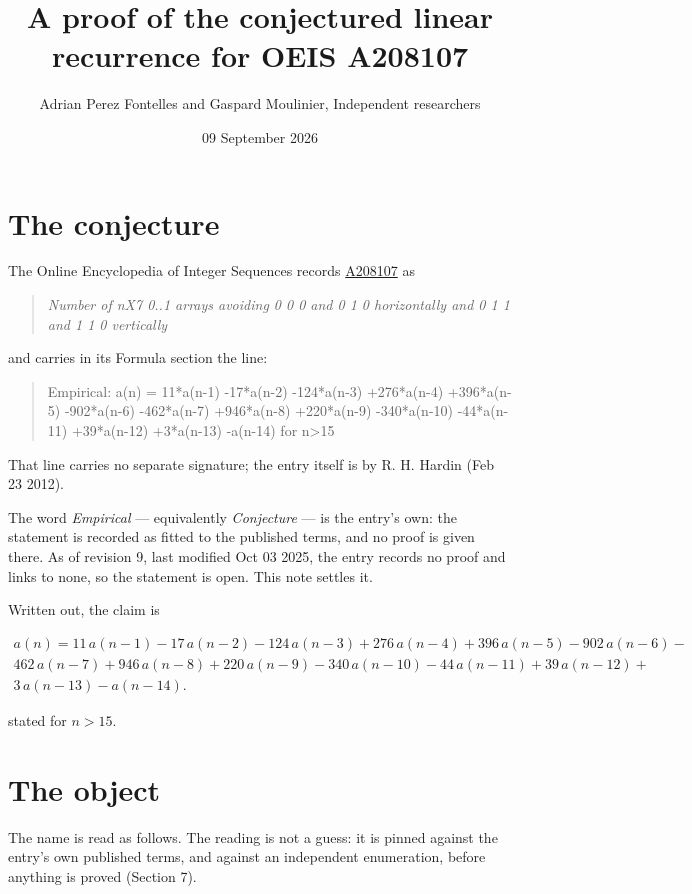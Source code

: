 \documentclass[11pt]{article}
\title{A proof of the conjectured linear recurrence for OEIS A208107}
\author{Adrian Perez Fontelles and Gaspard Moulinier, Independent researchers}
\date{09 September 2026}
\theoremstyle{definition}
\begin{document}
\maketitle
\section{The conjecture}

The Online Encyclopedia of Integer Sequences records \href{https://oeis.org/A208107}{A208107} as

\begin{quote}\itshape Number of nX7 0..1 arrays avoiding 0 0 0 and 0 1 0 horizontally and 0 1 1 and 1 1 0 vertically\end{quote}

and carries in its Formula section the line:

\begin{quote}\ttfamily Empirical: a(n) = 11*a(n-1) -17*a(n-2) -124*a(n-3) +276*a(n-4) +396*a(n-5) -902*a(n-6) -462*a(n-7) +946*a(n-8) +220*a(n-9) -340*a(n-10) -44*a(n-11) +39*a(n-12) +3*a(n-13) -a(n-14) for n>15\end{quote}

That line carries no separate signature; the entry itself is by R. H. Hardin (Feb 23 2012).

The word {\itshape Empirical} --- equivalently {\itshape Conjecture} --- is the entry's own: the statement is recorded as fitted to the published terms, and no proof is given there. As of revision 9, last modified Oct 03 2025, the entry records no proof and links to none, so the statement is open. This note settles it.

Written out, the claim is

\begin{multline*} a(n) = 11\,a(n-1) - 17\,a(n-2) - 124\,a(n-3) + 276\,a(n-4) + 396\,a(n-5) - 902\,a(n-6) - \\ 462\,a(n-7) + 946\,a(n-8) + 220\,a(n-9) - 340\,a(n-10) - 44\,a(n-11) + 39\,a(n-12) + \\ 3\,a(n-13) - a(n-14). \end{multline*}

stated for $n > 15$.

\section{The object}

The name is read as follows. The reading is not a guess: it is pinned against the entry's own published terms, and against an independent enumeration, before anything is proved (Section 7).
\end{document}
